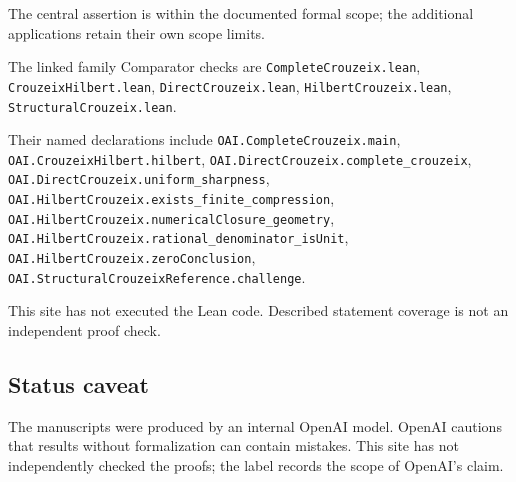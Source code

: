 \documentclass[11pt]{article}
\begin{document}
The central assertion is within the documented formal scope; the additional applications retain their own scope limits.

The linked family Comparator checks are \texttt{CompleteCrouzeix.lean}, \texttt{CrouzeixHilbert.lean}, \texttt{DirectCrouzeix.lean}, \texttt{HilbertCrouzeix.lean}, \texttt{StructuralCrouzeix.lean}.

Their named declarations include \texttt{OAI.CompleteCrouzeix.main}, \texttt{OAI.CrouzeixHilbert.hilbert}, \texttt{OAI.DirectCrouzeix.complete\_crouzeix}, \texttt{OAI.DirectCrouzeix.uniform\_sharpness}, \texttt{OAI.HilbertCrouzeix.exists\_finite\_compression}, \texttt{OAI.HilbertCrouzeix.numericalClosure\_geometry}, \texttt{OAI.HilbertCrouzeix.rational\_denominator\_isUnit}, \texttt{OAI.HilbertCrouzeix.zeroConclusion}, \texttt{OAI.StructuralCrouzeixReference.challenge}.

This site has not executed the Lean code. Described statement coverage is not an independent proof check.

\subsection{Status caveat}
The manuscripts were produced by an internal OpenAI model. OpenAI cautions that results without formalization can contain mistakes. This site has not independently checked the proofs; the label records the scope of OpenAI's claim.
\end{document}
